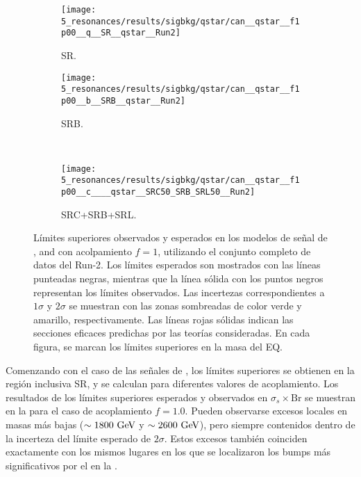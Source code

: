 \begin{figure}[ht!]
    \centering
    \begin{subfigure}[t]{0.49\linewidth}
        \centering
        \texttt{[image: 5\_resonances/results/sigbkg/qstar/can\_\_qstar\_\_f1p00\_\_q\_\_SR\_\_qstar\_\_Run2]}
        \caption{SR.}
        \label{fig:results:results:bkgsig:results:qstar:limits:SR}
    \end{subfigure}
    \hfill
    \begin{subfigure}[t]{0.49\linewidth}
        \centering
        \texttt{[image: 5\_resonances/results/sigbkg/qstar/can\_\_qstar\_\_f1p00\_\_b\_\_SRB\_\_qstar\_\_Run2]}
        \caption{SRB.}
        \label{fig:results:results:bkgsig:results:qstar:limits:SRB}
    \end{subfigure}\\
    \begin{subfigure}[t]{0.49\linewidth}
        \centering
        \texttt{[image: 5\_resonances/results/sigbkg/qstar/can\_\_qstar\_\_f1p00\_\_c\_\_\_\_qstar\_\_SRC50\_SRB\_SRL50\_\_Run2]}
        \caption{SRC+SRB+SRL.}
        \label{fig:results:results:bkgsig:results:qstar:limits:SRC}
    \end{subfigure}
    \caption{Límites superiores observados y esperados en los modelos de señal de \qstar, \cstar and \bstar con acolpamiento \(f=1\), utilizando el conjunto completo de datos del Run-2. Los límites esperados son mostrados con las líneas punteadas negras, mientras que la línea sólida con los puntos negros representan los límites observados. Las incertezas correspondientes a \(1\sigma\) y \(2\sigma\) se muestran con las zonas sombreadas de color verde y amarillo, respectivamente. Las líneas rojas sólidas indican las secciones eficaces predichas por las teorías consideradas. En cada figura, se marcan los límites superiores en la masa del \ac{EQ}.}
    \label{fig:results:results:bkgsig:results:qstar:limits}
\end{figure}

Comenzando con el caso de las señales de \qstar, los límites superiores se obtienen en la región inclusiva SR, y se calculan para diferentes valores de acoplamiento. Los resultados de los límites superiores esperados y observados en \(\sigma_s \times \text{Br}\) se muestran en la \Fig{\ref{fig:results:results:bkgsig:results:qstar:limits:SR}} para el caso de acoplamiento \(f=1.0\). Pueden observarse excesos locales en masas más bajas (\(\sim 1800~\text{GeV}\) y \(\sim 2600~\text{GeV}\)), pero siempre contenidos dentro de la incerteza del límite esperado de \(2\sigma\). Estos excesos también coinciden exactamente con los mismos lugares en los que se localizaron los bumps más significativos por el \bh en la \Fig{\ref{fig:results:results:bkgonly:bh:SR}}.

